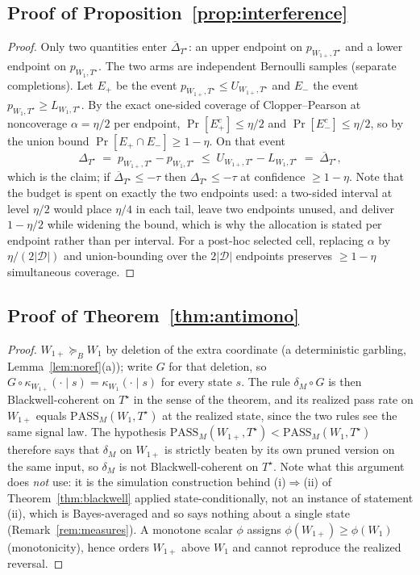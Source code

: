 \documentclass[11pt]{article}
\theoremstyle{plain}
\theoremstyle{definition}
\theoremstyle{remark}
\newcommand{\PASS}{\mathrm{PASS}}
\newcommand{\Dcal}{\mathcal{D}}
\newcommand{\Bord}{\succeq_{B}}
\begin{document}
\subsection*{Proof of Proposition~\ref{prop:interference}}
\begin{proof}
Only two quantities enter $\overline\Delta_{T^\star}$: an upper endpoint on $p_{W_{1+},T^\star}$
and a lower endpoint on $p_{W_1,T^\star}$. The two arms are independent Bernoulli samples
(separate completions). Let $E_+$ be the event $p_{W_{1+},T^\star}\le U_{W_{1+},T^\star}$ and
$E_-$ the event $p_{W_1,T^\star}\ge L_{W_1,T^\star}$. By the exact one-sided coverage of
Clopper--Pearson at noncoverage $\alpha=\eta/2$ per endpoint, $\Pr[E_+^c]\le\eta/2$ and
$\Pr[E_-^c]\le\eta/2$, so by the union bound $\Pr[E_+\cap E_-]\ge 1-\eta$. On that event
\[
  \Delta_{T^\star} \;=\; p_{W_{1+},T^\star}-p_{W_1,T^\star}
  \;\le\; U_{W_{1+},T^\star}-L_{W_1,T^\star} \;=\; \overline\Delta_{T^\star},
\]
which is the claim; if $\overline\Delta_{T^\star}\le-\tau$ then $\Delta_{T^\star}\le-\tau$ at
confidence $\ge 1-\eta$. Note that the budget is spent on exactly the two endpoints used: a
two-sided interval at level $\eta/2$ would place $\eta/4$ in each tail, leave two endpoints
unused, and deliver $1-\eta/2$ while widening the bound, which is why the allocation is stated
per endpoint rather than per interval. For a post-hoc selected cell, replacing $\alpha$ by
$\eta/(2|\Dcal|)$ and union-bounding over the $2|\Dcal|$ endpoints preserves $\ge 1-\eta$
simultaneous coverage.
\end{proof}

\subsection*{Proof of Theorem~\ref{thm:antimono}}
\begin{proof}
$W_{1+}\Bord W_1$ by deletion of the extra coordinate (a deterministic garbling,
Lemma~\ref{lem:noref}(a)); write $G$ for that deletion, so
$G\circ\kappa_{W_{1+}}(\cdot\mid s)=\kappa_{W_1}(\cdot\mid s)$ for every state $s$. The rule
$\delta_M\circ G$ is then Blackwell-coherent on $T^\star$ in the sense of the theorem, and its
realized pass rate on $W_{1+}$ equals $\PASS_M(W_1,T^\star)$ at the realized state, since the two
rules see the same signal law. The hypothesis
$\PASS_M(W_{1+},T^\star)<\PASS_M(W_1,T^\star)$ therefore says that $\delta_M$ on $W_{1+}$ is
strictly beaten by its own pruned version on the same input, so $\delta_M$ is not
Blackwell-coherent on $T^\star$. Note what this argument does \emph{not} use: it is the
simulation construction behind \textup{(i)}$\Rightarrow$\textup{(ii)} of
Theorem~\ref{thm:blackwell} applied state-conditionally, not an instance of statement
\textup{(ii)}, which is Bayes-averaged and so says nothing about a single state
(Remark~\ref{rem:measures}). A monotone scalar $\phi$ assigns
$\phi(W_{1+})\ge\phi(W_1)$ (monotonicity), hence orders $W_{1+}$ above $W_1$ and cannot reproduce
the realized reversal.
\end{proof}
\end{document}
